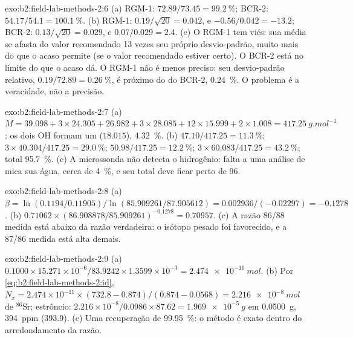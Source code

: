 \begin{solution}{exo:b2:field-lab-methods-2:6}
(a) RGM-1: $72.89/73.45 = \qty{99.2}{\percent}$; BCR-2: $54.17/54.1 = \qty{100.1}{\percent}$.
(b) RGM-1: $0.19/\sqrt{20} = 0.042$, e $-0.56/0.042 = -13.2$; BCR-2: $0.13/\sqrt{20} = 0.029$, e
$0.07/0.029 = 2.4$. (c) O RGM-1 tem viés: sua média se afasta do valor recomendado 13 vezes seu próprio
desvio-padrão, muito mais do que o acaso permite (se o valor recomendado estiver certo). O BCR-2 está no
limite do que o acaso dá. O RGM-1 não é menos preciso: seu desvio-padrão relativo,
$0.19/72.89 = \qty{0.26}{\percent}$, é próximo do do BCR-2, \qty{0.24}{\percent}. O problema é a
veracidade, não a precisão.
\end{solution}

\begin{solution}{exo:b2:field-lab-methods-2:7}
(a) $M = 39.098 + 3 \times 24.305 + 26.982 + 3 \times 28.085 + 12 \times 15.999 + 2 \times 1.008 =
\qty{417.25}{g.mol^{-1}}$; os dois OH formam um  ($18.015$), \qty{4.32}{\percent}.
(b)  $47.10/417.25 = \qty{11.3}{\percent}$;  $3 \times 40.304/417.25 =
\qty{29.0}{\percent}$;  $50.98/417.25 = \qty{12.2}{\percent}$;  $3 \times
60.083/417.25 = \qty{43.2}{\percent}$; total \qty{95.7}{\percent}. (c) A microssonda não
detecta o hidrogênio: falta a uma análise de mica sua água, cerca de \qty{4}{\percent}, e seu total deve ficar perto de
96.
\end{solution}

\begin{solution}{exo:b2:field-lab-methods-2:8}
(a) $\beta = \ln(0.1194/0.11905)/\ln(85.909261/87.905612) = 0.002936/(-0.02297) = -0.1278$.
(b) $0.71062 \times (86.908878/85.909261)^{-0.1278} = 0.70957$. (c) A razão 86/88 medida está abaixo da
razão verdadeira: o isótopo pesado foi favorecido, e a 87/86 medida está alta demais.
\end{solution}

\begin{solution}{exo:b2:field-lab-methods-2:9}
(a) $0.1000 \times 15.271 \times 10^{-6}/83.9242 \times 1.3599 \times 10^{-3} = \qty{2.474e-11}{mol}$.
(b) Por \eqref{eq:b2:field-lab-methods-2:id}, $N_x = 2.474 \times 10^{-11} \times (732.8 -
0.874)/(0.874 - 0.0568) = \qty{2.216e-8}{mol}$ de $^{86}\mathrm{Sr}$; estrôncio: $2.216 \times
10^{-8}/0.0986 \times 87.62 = \qty{1.969e-5}{g}$ em \qty{0.0500}{g}, \qty{394}{ppm} (393.9).
(c) Uma recuperação de \qty{99.95}{\percent}: o método é exato dentro do arredondamento da razão.
\end{solution}

